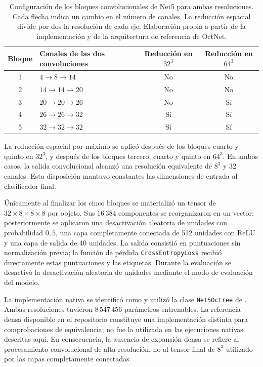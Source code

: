 \begin{table}[htbp]
\centering\small
\caption{Configuración de los bloques convolucionales de Net5 para ambas resoluciones. Cada flecha indica un cambio en el número de canales. La reducción espacial divide por dos la resolución de cada eje. Elaboración propia a partir de la implementación y de la arquitectura de referencia de OctNet.}
\label{tab:net5-arquitectura}
\begin{tabular}{@{}clcc@{}}
\toprule
Bloque & Canales de las dos convoluciones & Reducción en $32^3$ & Reducción en $64^3$ \\
\midrule
1 & $4\to8\to14$ & No & No \\
2 & $14\to14\to20$ & No & No \\
3 & $20\to20\to26$ & No & Sí \\
4 & $26\to26\to32$ & Sí & Sí \\
5 & $32\to32\to32$ & Sí & Sí \\
\bottomrule
\end{tabular}
\end{table}

La reducción espacial por máximo se aplicó después de los bloques cuarto y quinto en $32^3$, y después de los bloques tercero, cuarto y quinto en $64^3$. En ambos casos, la salida convolucional alcanzó una resolución equivalente de $8^3$ y 32 canales. Esta disposición mantuvo constantes las dimensiones de entrada al clasificador final.

Únicamente al finalizar los cinco bloques se materializó un tensor de $32\times8\times8\times8$ por objeto. Sus $16\,384$ componentes se reorganizaron en un vector; posteriormente se aplicaron una desactivación aleatoria de unidades con probabilidad $0{,}5$, una capa completamente conectada de 512 unidades con ReLU y una capa de salida de 40 unidades. La salida consistió en puntuaciones sin normalización previa; la función de pérdida \texttt{CrossEntropyLoss} recibió directamente estas puntuaciones y las etiquetas. Durante la evaluación se desactivó la desactivación aleatoria de unidades mediante el modo de evaluación del modelo.

La implementación nativa se identificó como \protect{} y utilizó la clase \texttt{Net5Octree} de \protect{}. Ambas resoluciones tuvieron $8\,547\,456$ parámetros entrenables. La referencia densa disponible en el repositorio constituye una implementación distinta para comprobaciones de equivalencia; no fue la utilizada en las ejecuciones nativas descritas aquí. En consecuencia, la ausencia de expansión densa se refiere al procesamiento convolucional de alta resolución, no al tensor final de $8^3$ utilizado por las capas completamente conectadas.

